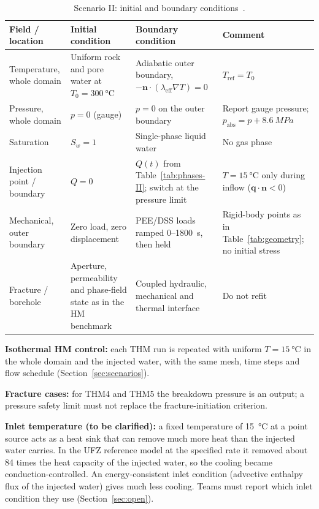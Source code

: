\documentclass[11pt,a4paper]{article}
\begin{document}
\begin{table}[htbp]
\centering
\caption{Scenario II: initial and boundary conditions~\cite{Pan2026}.}
\label{tab:icbc-II}
\small
\begin{tabularx}{\textwidth}{@{}lLLL@{}}
\toprule
Field / location & Initial condition & Boundary condition & Comment \\
\midrule
Temperature, whole domain & Uniform rock and pore water at $T_0=\SI{300}{\celsius}$ & Adiabatic outer boundary, $-\mathbf n\cdot(\lambda_\mathrm{eff}\nabla T)=0$ & $T_\mathrm{ref}=T_0$ \\
Pressure, whole domain    & $p=0$ (gauge) & $p=0$ on the outer boundary & Report gauge pressure; $p_\mathrm{abs}=p+\SI{8.6}{MPa}$ \\
Saturation                & $S_w=1$ & Single-phase liquid water & No gas phase \\
Injection point / boundary & $Q=0$ & $Q(t)$ from Table~\ref{tab:phases-II}; switch at the pressure limit & $T=\SI{15}{\celsius}$ only during inflow ($\mathbf q\cdot\mathbf n<0$) \\
Mechanical, outer boundary & Zero load, zero displacement & PEE/DSS loads ramped 0--\SI{1800}{s}, then held & Rigid-body points as in Table~\ref{tab:geometry}; no initial stress \\
Fracture / borehole       & Aperture, permeability and phase-field state as in the HM benchmark & Coupled hydraulic, mechanical and thermal interface & Do not refit \\
\bottomrule
\end{tabularx}
\end{table}

\textbf{Isothermal HM control:} each THM run is repeated with uniform
$T=\SI{15}{\celsius}$ in the whole domain and the injected water, with the same
mesh, time steps and flow schedule (Section~\ref{sec:scenarios}).

\textbf{Fracture cases:} for THM4 and THM5 the breakdown pressure is an output;
a pressure safety limit must not replace the fracture-initiation criterion.

\textbf{Inlet temperature (to be clarified):} a fixed temperature of
\SI{15}{\celsius} at a point source acts as a heat sink that can remove much
more heat than the injected water carries. In the UFZ reference model at the
specified rate it removed about 84 times the heat capacity of the injected
water, so the cooling became conduction-controlled. An energy-consistent inlet
condition (advective enthalpy flux of the injected water) gives much less
cooling. Teams must report which inlet condition they use
(Section~\ref{sec:open}).
\end{document}
